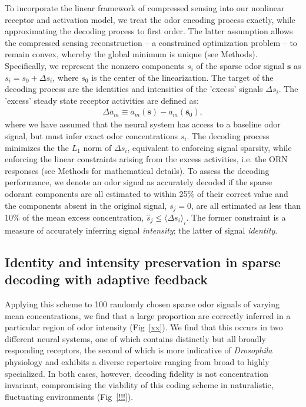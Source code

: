 To incorporate the linear framework of compressed sensing into our nonlinear receptor and activation model, we treat the odor encoding process exactly, while approximating the decoding process to first order. The latter assumption allows the compressed sensing reconstruction -- a constrained optimization problem -- to remain convex, whereby the global minimum is unique (see Methods). Specifically, we represent the nonzero components $s_i$ of the sparse odor signal $\mathbf s$ as $s_i = s_0 + \Delta s_i$, where $s_0$ is the center of the linearization. The target of the decoding process are the identities and intensities of the 'excess' signals $\Delta s_i$. The 'excess' steady state receptor activities are defined as:
\begin{align}
\Delta \bar a_m \equiv \bar a_m(\mathbf s) - \bar a_m(\mathbf s_0),
\end{align}
where we have assumed that the neural system has access to a baseline odor signal, but must infer exact odor concentrations $s_i$. The decoding process minimizes the the $L_1$ norm of $\Delta s_i$, equivalent to enforcing signal sparsity, while enforcing the linear constraints arising from the excess activities, i.e. the ORN responses (see Methods for mathematical details). To assess the decoding performance, we denote an odor signal as accurately decoded if the sparse odorant components are all estimated to within 25\% of their correct value and the components absent in the original signal, $s_j = 0$, are all estimated as less than 10\% of the mean excess concentration, $\hat s_j \le \langle \Delta s_i \rangle_i$. The former constraint is a measure of accurately inferring signal \textit{intensity}; the latter of signal \textit{identity}. 

\subsection*{Identity and intensity preservation in sparse decoding with adaptive feedback}

Applying this scheme to 100 randomly chosen sparse odor signals of varying mean concentrations, we find that a large proportion are correctly inferred in a particular region of odor intensity (Fig~\ref{xx}). We find that this occurs in two different neural systems, one of which contains distinctly but all broadly responding receptors, the second of which is more indicative of \textit{Drosophila} physiology and exhibits a diverse repertoire ranging from broad to highly specialized. In both cases, however, decoding fidelity is not concentration invariant, compromising the viability of this coding scheme in naturalistic, fluctuating environments (Fig~\ref{!!!}). 

